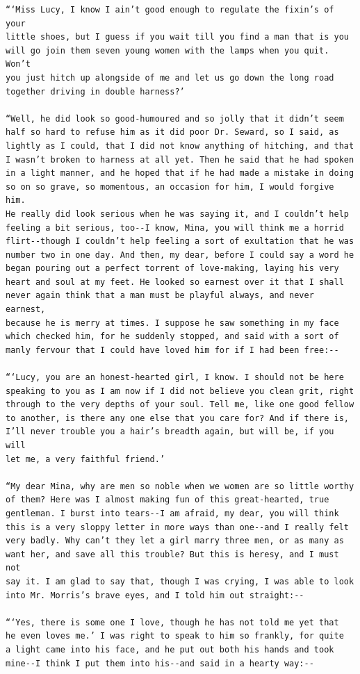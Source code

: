 \documentclass{article}
\begin{document}
\begin{verbatim}
“‘Miss Lucy, I know I ain’t good enough to regulate the fixin’s of your
little shoes, but I guess if you wait till you find a man that is you
will go join them seven young women with the lamps when you quit. Won’t
you just hitch up alongside of me and let us go down the long road
together driving in double harness?’

“Well, he did look so good-humoured and so jolly that it didn’t seem
half so hard to refuse him as it did poor Dr. Seward, so I said, as
lightly as I could, that I did not know anything of hitching, and that
I wasn’t broken to harness at all yet. Then he said that he had spoken
in a light manner, and he hoped that if he had made a mistake in doing
so on so grave, so momentous, an occasion for him, I would forgive him.
He really did look serious when he was saying it, and I couldn’t help
feeling a bit serious, too--I know, Mina, you will think me a horrid
flirt--though I couldn’t help feeling a sort of exultation that he was
number two in one day. And then, my dear, before I could say a word he
began pouring out a perfect torrent of love-making, laying his very
heart and soul at my feet. He looked so earnest over it that I shall
never again think that a man must be playful always, and never earnest,
because he is merry at times. I suppose he saw something in my face
which checked him, for he suddenly stopped, and said with a sort of
manly fervour that I could have loved him for if I had been free:--

“‘Lucy, you are an honest-hearted girl, I know. I should not be here
speaking to you as I am now if I did not believe you clean grit, right
through to the very depths of your soul. Tell me, like one good fellow
to another, is there any one else that you care for? And if there is,
I’ll never trouble you a hair’s breadth again, but will be, if you will
let me, a very faithful friend.’

“My dear Mina, why are men so noble when we women are so little worthy
of them? Here was I almost making fun of this great-hearted, true
gentleman. I burst into tears--I am afraid, my dear, you will think
this is a very sloppy letter in more ways than one--and I really felt
very badly. Why can’t they let a girl marry three men, or as many as
want her, and save all this trouble? But this is heresy, and I must not
say it. I am glad to say that, though I was crying, I was able to look
into Mr. Morris’s brave eyes, and I told him out straight:--

“‘Yes, there is some one I love, though he has not told me yet that
he even loves me.’ I was right to speak to him so frankly, for quite
a light came into his face, and he put out both his hands and took
mine--I think I put them into his--and said in a hearty way:--


\end{verbatim}
\end{document}
